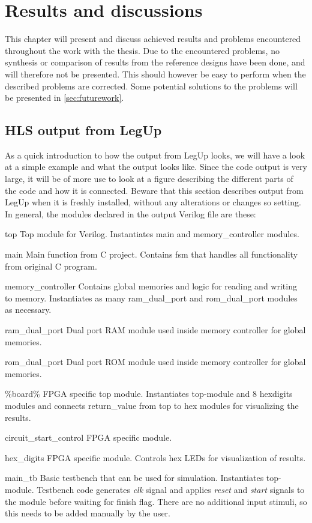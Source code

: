 \chapter{Results and discussions}
\label{chp:resdisc}
This chapter will present and discuss achieved results and problems encountered throughout the work with the thesis. Due to the encountered problems, no synthesis or comparison of results from the reference designs have been done, and will therefore not be presented. This should however be easy to perform when the described problems are corrected. Some potential solutions to the problems will be presented in \cref{sec:futurework}.
\section{HLS output from LegUp}
\label{sec:legupoutput}
As a quick introduction to how the output from LegUp looks, we will have a look at a simple example and what the output looks like. Since the code output is very large, it will be of more use to look at a figure describing the different parts of the code and how it is connected. Beware that this section describes output from LegUp when it is freshly installed, without any alterations or changes so setting. In general, the modules declared in the output Verilog file are these:
\begin{compactdesc}
    \item[top]Top module for Verilog. Instantiates main and memory\_controller modules.
    \item[main]Main function from C project. Contains \gls{fsm} that handles all functionality from original C program.
    \item[memory\_controller]Contains global memories and logic for reading and writing to memory. Instantiates as many ram\_dual\_port and rom\_dual\_port modules as necessary.
    \item[ram\_dual\_port] Dual port RAM module used inside memory controller for global memories.
    \item[rom\_dual\_port] Dual port ROM module used inside memory controller for global memories.
    \item[\%board\%]FPGA specific top module. Instantiates top-module and 8 hex{\textunderscore}digits modules and connects return\_value from top to hex modules for visualizing the results.
    \item[circuit\_start\_control]FPGA specific module. 
    \item[hex\_digits]FPGA specific module. Controls hex LEDs for visualization of results.
    \item[main\_tb]Basic testbench that can be used for simulation. Instantiates top-module. Testbench code generates \textit{clk} signal and applies \textit{reset} and \textit{start} signals to the module before waiting for finish flag. There are no additional input stimuli, so this needs to be added manually by the user.
\end{compactdesc}


